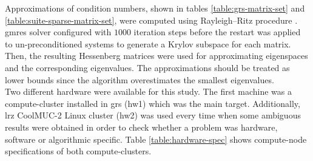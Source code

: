 Approximations of condition numbers, shown in tables \ref{table:grs-matrix-set} and \ref{table:suite-sparse-matrix-set},  were computed using Rayleigh–Ritz procedure \cite{rayleigh-ritz-procedure}. \acrshort{gmres} solver configured with $1000$ iteration steps before the restart was applied to un-preconditioned systems to generate a Krylov subspace for each matrix. Then, the resulting Hessenberg matrices were used for approximating eigenspaces and the corresponding eigenvalues. The approximations should be treated as lower bounds since the algorithm overestimates the smallest eigenvalues.\\




Two different hardware were available for this study. The first machine was a compute-cluster installed in \acrshort{grs} (\gls{hw1}) which was the main target. Additionally, \acrshort{lrz} CoolMUC-2 Linux cluster (\gls{hw2}) was used every time when some ambiguous results were obtained in order to check whether a problem was hardware, software or algorithmic specific. Table \ref{table:hardware-spec} shows compute-node specifications of both compute-clusters.\\



